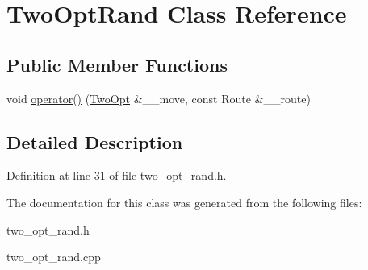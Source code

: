 \hypertarget{classTwoOptRand}{
\section{Two\-Opt\-Rand Class Reference}
\label{classTwoOptRand}
}
\subsection*{Public Member Functions}
\begin{CompactItemize}
\item 
\hypertarget{classTwoOptRand_e2f362f359517c027f6f22fba0aab375}{
void \hyperlink{classTwoOptRand_e2f362f359517c027f6f22fba0aab375}{operator()} (\hyperlink{classTwoOpt}{Two\-Opt} \&\_\-\_\-move, const Route \&\_\-\_\-route)}
\label{classTwoOptRand_e2f362f359517c027f6f22fba0aab375}

\end{CompactItemize}


\subsection{Detailed Description}




Definition at line 31 of file two\_\-opt\_\-rand.h.

The documentation for this class was generated from the following files:\begin{CompactItemize}
\item 
two\_\-opt\_\-rand.h\item 
two\_\-opt\_\-rand.cpp\end{CompactItemize}
